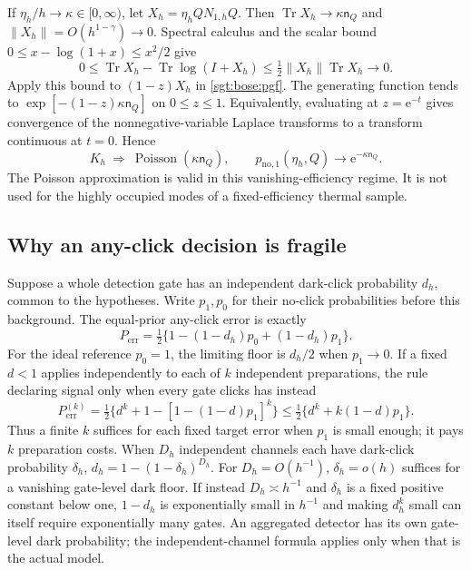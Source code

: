 \documentclass[aps,pra,reprint,superscriptaddress,longbibliography]{revtex4-2}
\newcommand{\Tr}{\operatorname{Tr}}
\newcommand{\ee}{\mathrm e}
\begin{document}
If $\eta_h/h\to\kappa\in[0,\infty)$, let
$X_h=\eta_h QN_{1,h}Q$.  Then
$\Tr X_h\to\kappa \mathsf n_Q$ and
$\|X_h\|=O(h^{1-\gamma})\to0$.  Spectral calculus and the scalar
bound $0\le x-\log(1+x)\le x^2/2$ give
\begin{equation}
 0\le\Tr X_h-\Tr\log(I+X_h)
   \le\tfrac12\|X_h\|\Tr X_h\longrightarrow0.
 \label{sgt:bose:poisson-remainder}
\end{equation}
Apply this bound to $(1-z)X_h$ in \eqref{sgt:bose:pgf}.  The generating
function tends to $\exp[-(1-z)\kappa \mathsf n_Q]$ on $0\le z\le1$.
Equivalently, evaluating at $z=\ee^{-t}$ gives convergence of the
nonnegative-variable Laplace transforms to a transform continuous at
$t=0$.  Hence
\begin{equation}
 K_h\ \Longrightarrow\ \operatorname{Poisson}(\kappa \mathsf n_Q),
 \qquad
 p_{\mathrm{no},1}(\eta_h,Q)\longrightarrow\ee^{-\kappa \mathsf n_Q}.
 \label{sgt:bose:poisson}
\end{equation}
The Poisson approximation is valid in this vanishing-efficiency regime.
It is not used for the highly occupied modes of a fixed-efficiency
thermal sample.

\subsection{Why an any-click decision is fragile}
\label{sgt:bose:fragility}

Suppose a whole detection gate has an independent dark-click probability
$d_h$, common to the hypotheses.  Write $p_1,p_0$ for their no-click
probabilities before this background.  The equal-prior any-click error
is exactly
\begin{equation}
 P_{\mathrm{err}}=\tfrac12
       \{1-(1-d_h)p_0+(1-d_h)p_1\}.
 \label{sgt:bose:dark-any-click}
\end{equation}
For the ideal reference $p_0=1$, the limiting floor is $d_h/2$ when
$p_1\to0$.  If a fixed $d<1$ applies independently to each of $k$
independent preparations, the rule declaring signal only when every
gate clicks has instead
\begin{equation}
 P_{\mathrm{err}}^{(k)}
  =\tfrac12\{d^k+1-[1-(1-d)p_1]^k\}
  \le\tfrac12\{d^k+k(1-d)p_1\}.
 \label{sgt:bose:dark-repeated}
\end{equation}
Thus a finite $k$ suffices for each fixed target error when $p_1$ is
small enough; it pays $k$ preparation costs.  When $D_h$ independent
channels each have dark-click probability $\delta_h$,
$d_h=1-(1-\delta_h)^{D_h}$.  For $D_h=O(h^{-1})$,
$\delta_h=o(h)$ suffices for a vanishing gate-level dark floor.
If instead $D_h\asymp h^{-1}$ and $\delta_h$ is a fixed positive
constant below one, $1-d_h$ is exponentially small in $h^{-1}$ and
making $d_h^k$ small can itself require exponentially many gates.
An aggregated detector has its own gate-level dark probability; the
independent-channel formula applies only when that is the actual model.
\end{document}
